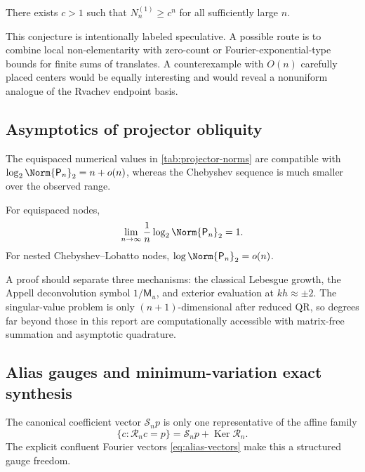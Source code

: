 \documentclass[11pt,oneside]{article}
\numberwithin{equation}{section}
\theoremstyle{definition}
\theoremstyle{remark}
\newcommand{\Ker}{\operatorname{Ker}}
\newcommand{\MGF}{\mathsf M}
\newcommand{\Synth}{\mathcal R}
\newcommand{\Coeff}{\mathcal S}
\newcommand{\Proj}{\mathsf P}
\begin{document}
\begin{conjecture}
\label{conj:fixed-radius-exponential}
There exists $c>1$ such that $N_n^{(1)}\ge c^n$ for all sufficiently large
$n$.
\end{conjecture}

This conjecture is intentionally labeled speculative.  A possible route is
to combine local non-elementarity with zero-count or Fourier-exponential-type
bounds for finite sums of translates.  A counterexample with $O(n)$
carefully placed centers would be equally interesting and would reveal a
nonuniform analogue of the Rvachev endpoint basis.

\subsection{Asymptotics of projector obliquity}

The equispaced numerical values in \cref{tab:projector-norms} are compatible
with $\log_2\Norm{\Proj_n}_2=n+o(n)$, whereas the Chebyshev sequence is much
smaller over the observed range.

\begin{conjecture}
\label{conj:equi-projector}
For equispaced nodes,
\begin{equation}
 \lim_{n\to\infty}\frac1n\log_2\Norm{\Proj_n}_2=1.
 \label{eq:equi-projector-conj}
\end{equation}
For nested Chebyshev--Lobatto nodes,
$\log\Norm{\Proj_n}_2=o(n)$.
\end{conjecture}

A proof should separate three mechanisms: the classical Lebesgue growth, the
Appell deconvolution symbol $1/\MGF_u$, and exterior evaluation at
$kh\approx\pm2$.  The singular-value problem is only $(n+1)$-dimensional
after reduced QR, so degrees far beyond those in this report are
computationally accessible with matrix-free summation and asymptotic
quadrature.

\subsection{Alias gauges and minimum-variation exact synthesis}

The canonical coefficient vector $\Coeff_np$ is only one representative of
the affine family
\begin{equation}
 \{c:\Synth_nc=p\}=\Coeff_np+\Ker\Synth_n.
 \label{eq:alias-affine-family}
\end{equation}
The explicit confluent Fourier vectors \eqref{eq:alias-vectors} make this a
structured gauge freedom.
\end{document}
